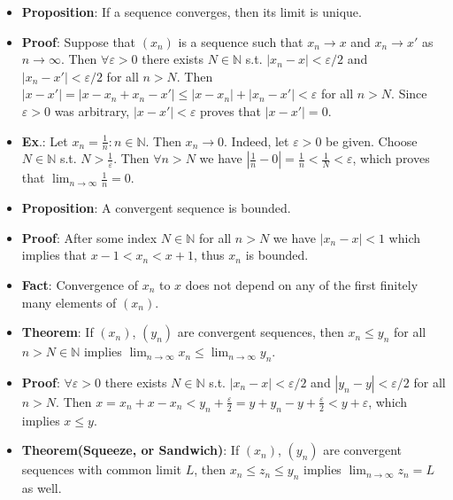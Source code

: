 \documentclass{article}
\begin{document}
\begin{itemize}
\item \textbf{Proposition}: If a sequence converges, then its limit is unique. 

\item \textbf{Proof}: Suppose that $(x_n)$ is a sequence such that $x_n \to x$ and $x_n \to x'$ as $n\to\infty$. Then $\forall \varepsilon > 0$ there exists $N \in \mathbb{N}$ s.t. $|x_n - x| < \varepsilon/2$ and $|x_n - x'| < \varepsilon/2$ for all $n > N$. Then $|x - x'| = |x - x_n + x_n - x'| \leq |x - x_n| + |x_n - x'| < \varepsilon$ for all $n > N$. Since $\varepsilon > 0$ was arbitrary, $|x - x'| < \varepsilon$ proves that $|x - x'| = 0$.

\item \textbf{Ex}.: Let $x_n = \frac{1}{n} : n \in \mathbb{N}$. Then $x_n \to 0$. Indeed, let $\varepsilon > 0$ be given. Choose $N \in \mathbb{N}$ s.t. $N > \frac{1}{\varepsilon}$. Then $\forall n > N$ we have $|\frac{1}{n} - 0| = \frac{1}{n} < \frac{1}{N} < \varepsilon$, which proves that $\displaystyle \lim_{n\to\infty} \frac{1}{n} = 0$.

\item \textbf{Proposition}: A convergent sequence is bounded.

\item \textbf{Proof}: After some index $N \in \mathbb{N}$ for all $n > N$ we have $|x_n - x| < 1$ which implies that $x - 1 < x_n < x + 1$, thus $x_n$ is bounded.

\item \textbf{Fact}: Convergence of $x_n$ to $x$ does not depend on any of the first finitely many elements of $(x_n)$.

\item \textbf{Theorem}: If $(x_n)$, $(y_n)$ are convergent sequences, then $x_n \leq y_n$ for all $n > N \in \mathbb{N}$ implies $\lim_{n\to\infty} x_n \leq \lim_{n\to\infty} y_n$. 

\item \textbf{Proof}: $\forall \varepsilon > 0$ there exists $N \in \mathbb{N}$ s.t. $|x_n - x| < \varepsilon/2$ and $|y_n - y| < \varepsilon/2$ for all $n > N$. Then $x = x_n + x - x_n < y_n + \frac{\varepsilon}{2} = y + y_n - y + \frac{\varepsilon}{2} < y + \varepsilon$, which implies $x \leq y$.

\item \textbf{Theorem(Squeeze, or Sandwich)}: If $(x_n)$, $(y_n)$ are convergent sequences with common limit $L$, then $x_n \leq z_n \leq y_n$ implies $\displaystyle \lim_{n\to\infty} z_n = L$ as well. 


\end{itemize}
\end{document}
